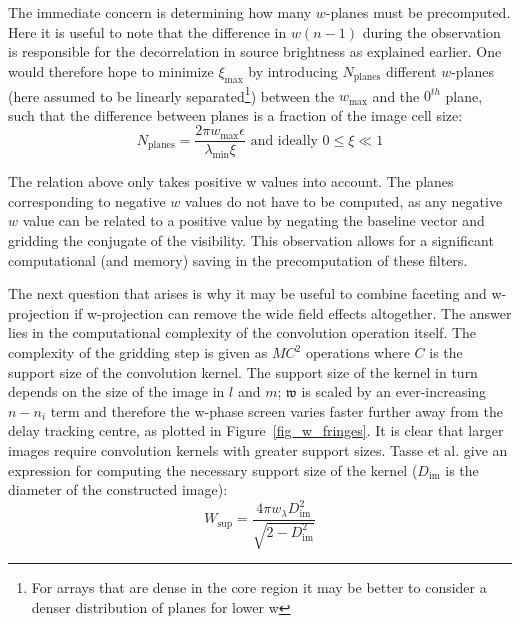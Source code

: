 The immediate concern is determining how many $w$-planes must be precomputed. Here it is useful to note that the difference in $w(n-1)$ during the
observation is responsible for the decorrelation in source brightness as explained earlier. One would therefore hope to minimize $\xi_{\text{max}}$ by introducing
$N_{\text{planes}}$ different $w$-planes (here assumed to be linearly separated\footnote{For arrays that are dense in the core region it may be better to consider
a denser distribution of planes for lower w}) between the $w_{\text{max}}$ and the $0^{th}$ plane, such that the difference between planes is a fraction of the image cell size:
\begin{equation}
 N_{\text{planes}}=\frac{2{\pi}w_{\text{max}}\epsilon}{{\lambda_{\text{min}}}{\xi}} \text{ and ideally } 0{\leq\xi\ll}1
\end{equation}

The relation above only takes positive w values into account. The planes corresponding to negative $w$ values do not have to be computed,
as any negative $w$ value can be related to a positive value by negating the baseline vector and gridding the conjugate of the visibility. This observation allows
for a significant computational (and memory) saving in the precomputation of these filters.

The next question that arises is why it may be useful to combine faceting and w-projection if w-projection can remove the wide field effects altogether. The answer
lies in the computational complexity of the convolution operation itself. The complexity of the gridding step is given as $MC^2$ operations where $C$ is the support
size of the convolution kernel. The support size of the kernel in turn depends on the size of the image in $l$ and $m$; $\mathfrak{w}$ is scaled by an 
ever-increasing $n-n_i$ term and therefore the w-phase screen varies faster further away from the delay tracking centre, as plotted 
in Figure~\ref{fig_w_fringes}. It is clear that larger images require convolution kernels with greater support sizes. Tasse et al. \cite{tasse2013applying} give 
an expression for computing the necessary support size of the kernel ($D_{\text{im}}$ is the diameter of the constructed image):
\begin{equation}
W_{\text{sup}}=\frac{4{\pi}w_{\lambda}D^2_{\text{im}}}{\sqrt{2-D^2_{\text{im}}}}
\end{equation}

